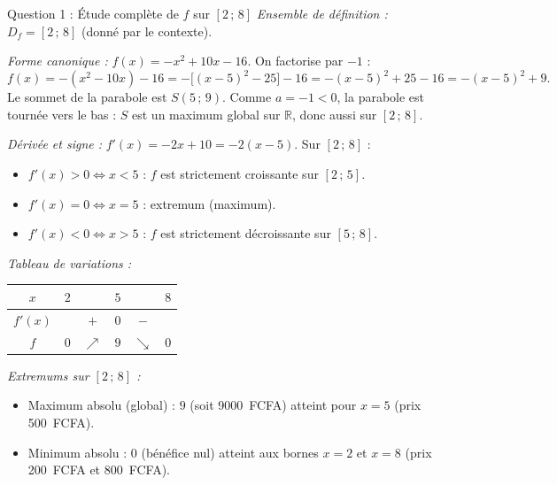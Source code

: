 \documentclass[11pt]{article}
\begin{document}
\begin{exoresolu}{Question 1 : Étude complète de $f$ sur $[2\,;\,8]$}
\emph{Ensemble de définition :} $D_f = [2\,;\,8]$ (donné par le contexte).

\emph{Forme canonique :} $f(x) = -x^2 + 10x - 16$. On factorise par $-1$ :
\[
f(x) = -(x^2 - 10x) - 16 = -\big[(x-5)^2 - 25\big] - 16 = -(x-5)^2 + 25 - 16 = -(x-5)^2 + 9.
\]
Le sommet de la parabole est $S(5\,;\,9)$. Comme $a=-1<0$, la parabole est tournée vers le bas : $S$ est un maximum global sur $\mathbb{R}$, donc aussi sur $[2\,;\,8]$.

\emph{Dérivée et signe :} $f'(x) = -2x + 10 = -2(x-5)$.
Sur $[2\,;\,8]$ :
\begin{itemize}
    \item $f'(x) > 0 \Leftrightarrow x < 5$ : $f$ est strictement croissante sur $[2\,;\,5]$.
    \item $f'(x) = 0 \Leftrightarrow x = 5$ : extremum (maximum).
    \item $f'(x) < 0 \Leftrightarrow x > 5$ : $f$ est strictement décroissante sur $[5\,;\,8]$.
\end{itemize}

\emph{Tableau de variations :}
\begin{center}
\begin{tabular}{|c|ccccc|}\hline
$x$ & $2$ & & $5$ & & $8$ \\ \hline
$f'(x)$ & & $+$ & $0$ & $-$ & \\ \hline
$f$ & $0$ & $\nearrow$ & $9$ & $\searrow$ & $0$ \\ \hline
\end{tabular}
\end{center}

\emph{Extremums sur $[2\,;\,8]$ :}
\begin{itemize}
    \item Maximum absolu (global) : $9$ (soit \SI{9000}{FCFA}) atteint pour $x=5$ (prix \SI{500}{FCFA}).
    \item Minimum absolu : $0$ (bénéfice nul) atteint aux bornes $x=2$ et $x=8$ (prix \SI{200}{FCFA} et \SI{800}{FCFA}).
\end{itemize}
\end{exoresolu}
\end{document}
